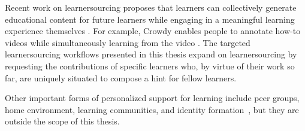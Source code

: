 Recent work on learnersourcing proposes that learners can collectively generate educational content for future learners while engaging in a meaningful learning experience themselves \cite{kim2013learnersourcing,weir2015,mitros2015}. For example, Crowdy enables people to annotate how-to videos while simultaneously learning from the video \cite{weir2015}. The targeted learnersourcing workflows presented in this thesis expand on learnersourcing by requesting the contributions of specific learners who, by virtue of their work so far, are uniquely situated to compose a hint for fellow learners. %

Other important forms of personalized support for learning include peer groups, home environment, learning communities, and identity formation~\cite{walberg1984improving,case2008education}, but they are outside the scope of this thesis.




